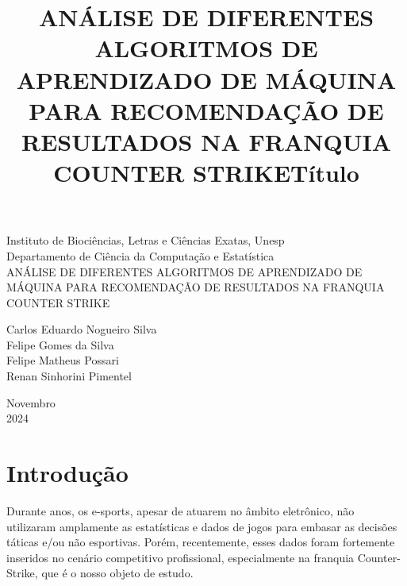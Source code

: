 \documentclass[a4paper,times,12pt]{article}
\begin{document}
\title{ANÁLISE DE DIFERENTES ALGORITMOS DE APRENDIZADO DE MÁQUINA PARA RECOMENDAÇÃO DE RESULTADOS NA FRANQUIA COUNTER STRIKE}
\begin{titlepage}
  \begin{center}

    \Huge{Instituto de Bioci\^{e}ncias, Letras e Ci\^{e}ncias Exatas, Unesp}\\
    \large{Departamento de Ciência da Computação e Estatística}\\ 

    \vspace{15pt}
    \vspace{95pt}
    {\LARGE{ANÁLISE DE DIFERENTES ALGORITMOS DE APRENDIZADO DE MÁQUINA PARA RECOMENDAÇÃO DE RESULTADOS NA FRANQUIA COUNTER STRIKE}} \\
    \title{{\large{Título}}}
    \vspace{3,5cm}
    Carlos Eduardo Nogueiro Silva\\
    Felipe Gomes da Silva \\
    Felipe Matheus Possari \\
    Renan Sinhorini Pimentel \\
  \end{center}


  \vspace{1cm}
  \begin{center}
    \vspace{\fill}
    Novembro\\
    2024
  \end{center}
\end{titlepage}
\newpage
\tableofcontents
\thispagestyle{empty}
\newpage


\section{Introdução}
\hspace{+15pt} 
Durante anos, os e-sports, apesar de atuarem no âmbito eletrônico, não utilizaram amplamente as estatísticas e dados de jogos para embasar as decisões táticas e/ou não esportivas. Porém, recentemente, esses dados foram fortemente inseridos no cenário competitivo profissional, especialmente na franquia Counter-Strike, que é o nosso objeto de estudo.
\end{document}
